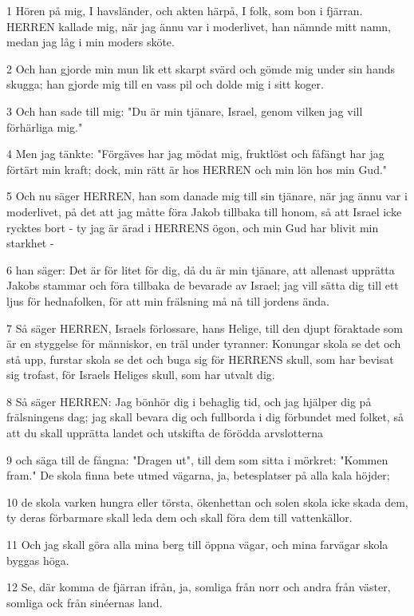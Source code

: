 \par 1 Hören på mig, I havsländer, och akten härpå, I folk, som bon i fjärran. HERREN kallade mig, när jag ännu var i moderlivet, han nämnde mitt namn, medan jag låg i min moders sköte.
\par 2 Och han gjorde min mun lik ett skarpt svärd och gömde mig under sin hands skugga; han gjorde mig till en vass pil och dolde mig i sitt koger.
\par 3 Och han sade till mig: "Du är min tjänare, Israel, genom vilken jag vill förhärliga mig."
\par 4 Men jag tänkte: "Förgäves har jag mödat mig, fruktlöst och fåfängt har jag förtärt min kraft; dock, min rätt är hos HERREN och min lön hos min Gud."
\par 5 Och nu säger HERREN, han som danade mig till sin tjänare, när jag ännu var i moderlivet, på det att jag måtte föra Jakob tillbaka till honom, så att Israel icke rycktes bort - ty jag är ärad i HERRENS ögon, och min Gud har blivit min starkhet -
\par 6 han säger: Det är för litet för dig, då du är min tjänare, att allenast upprätta Jakobs stammar och föra tillbaka de bevarade av Israel; jag vill sätta dig till ett ljus för hednafolken, för att min frälsning må nå till jordens ända.
\par 7 Så säger HERREN, Israels förlossare, hans Helige, till den djupt föraktade som är en styggelse för människor, en träl under tyranner: Konungar skola se det och stå upp, furstar skola se det och buga sig för HERRENS skull, som har bevisat sig trofast, för Israels Heliges skull, som har utvalt dig.
\par 8 Så säger HERREN: Jag bönhör dig i behaglig tid, och jag hjälper dig på frälsningens dag; jag skall bevara dig och fullborda i dig förbundet med folket, så att du skall upprätta landet och utskifta de förödda arvslotterna
\par 9 och säga till de fångna: "Dragen ut", till dem som sitta i mörkret: "Kommen fram." De skola finna bete utmed vägarna, ja, betesplatser på alla kala höjder;
\par 10 de skola varken hungra eller törsta, ökenhettan och solen skola icke skada dem, ty deras förbarmare skall leda dem och skall föra dem till vattenkällor.
\par 11 Och jag skall göra alla mina berg till öppna vägar, och mina farvägar skola byggas höga.
\par 12 Se, där komma de fjärran ifrån, ja, somliga från norr och andra från väster, somliga ock från sinéernas land.
